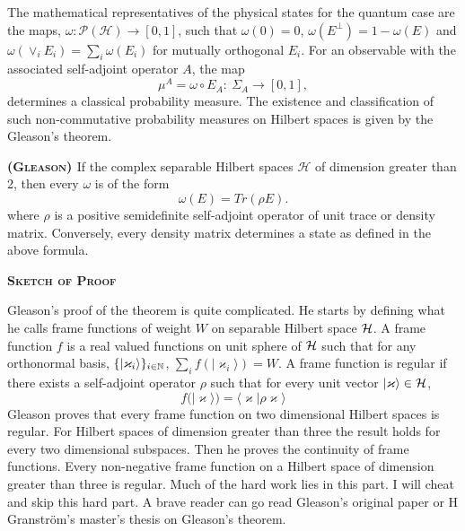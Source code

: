 \documentclass[11pt]{report}
\begin{document}
			The mathematical representatives of the physical states for the quantum case are the maps, $\omega:\mathcal{P}(\mathcal{H})\to [0,1]$, such that $\omega(0)=0$, $\omega(E^\perp)=1-\omega(E)$ and $\omega(\vee_i E_i)=\sum_i \omega(E_i)$ for mutually orthogonal $E_i$. For an observable with the associated self-adjoint operator $A$, the map 
			$$\mu^A=\omega\circ  E_A:\:\Sigma_A\to [0,1],$$ 
			determines a classical probability measure. The existence and classification of such non-commutative probability measures on Hilbert spaces is given by the Gleason's theorem.
			
			\vspace{.5em}
			\begin{theorem}
				{\bfseries{\textsc{(Gleason) }}} If the complex separable Hilbert spaces $\mathcal{H}$ of dimension greater than 2, then every $\omega$ is of the form
				$$\omega(E)=Tr(\rho E).$$
				where $\rho$ is a positive semidefinite self-adjoint operator of unit trace or density matrix. Conversely, every density matrix determines a state as defined in the above formula.
			\end{theorem}
			\vspace{.5em}
			
			\begin{center}
				{\bfseries \textsc{Sketch of Proof}}
			\end{center}
			Gleason's proof of the theorem is quite complicated. He starts by defining what he calls frame functions of weight $W$ on separable Hilbert space $\mathcal {H}$. A frame function $f$ is a real valued functions on unit sphere of $\mathcal {H}$ such that for any orthonormal basis, $\{|\varkappa_i\rangle\}_{i\in\mathbb{N}}$, $\sum_if(|\varkappa_i\rangle)=W.$
			A frame function is regular if there exists a self-adjoint operator $\rho$ such that for every unit vector $|\varkappa\rangle\in\mathcal {H}$,
			$$f(|\varkappa\rangle)=\langle \varkappa |\rho\varkappa\rangle$$ 
			Gleason proves that every frame function on two dimensional Hilbert spaces is regular. For Hilbert spaces of dimension greater than three the result holds for every two dimensional subspaces. Then he proves the continuity of frame functions. Every non-negative frame function on a Hilbert space of dimension greater than three is regular. Much of the hard work lies in this part. I will cheat and skip this hard part. A brave reader can go read Gleason's original paper \cite{Gleason} or H Granstr\"om's master's thesis \cite{Helena} on Gleason's theorem.
			
\end{document}
